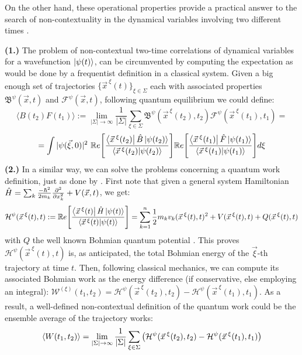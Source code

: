 \documentclass[11pt, a4paper]{article} %
\newcommand{\B}{\mathfrak{B}}
\begin{document}
On the other hand, these operational properties provide a practical answer to the search of non-contextuality in the dynamical variables involving two different times \cite{DevInPosition1}. 

{\bf (1.)} The problem of non-contextual two-time correlations of dynamical variables for a wavefunction $\ket{\psi(t)}$, can be circumvented by computing the expectation as would be done by a frequentist definition in a classical system. Given a big enough set of trajectories $\{\vec{x}^{\:\xi}(t)\}_{\xi\in \Sigma}$ each with associated properties $\B^\psi(\vec{x},t)$ and $\mathcal{F}^\psi(\vec{x},t)$, following quantum equilibrium \cite{Absolute} we could define:\vspace{-0.2cm}
\begin{equation}
\langle B(t_2)F(t_1)\rangle := \lim_{|\Sigma|\rightarrow \infty}\frac{1}{|\Sigma|} \sum_{\xi\in\Sigma} \B^\psi(\vec{x}^{\:\xi}(t_2),t_2)\mathcal{F}^\psi(\vec{x}^{\:\xi}(t_1),t_1) =
\end{equation}
$$
=  \int |\psi(\vec{\xi},0)|^2\ \mathbb{R}e\qty[ \frac{\bra{\vec{x}^{\:\xi}(t_2)}\hat{B}\ket{\psi(t_2)}}{\bra{\vec{x}^{\:\xi}(t_2)}\ket{\psi(t_2)}} ] \mathbb{R}e\qty[ \frac{\bra{\vec{x}^{\:\xi}(t_1)}\hat{F}\ket{\psi(t_1)}}{\bra{\vec{x}^{\:\xi}(t_1)}\ket{\psi(t_1)}} ]d\xi
$$
{\bf (2.) } In a similar way, we can solve the problems concerning a quantum work definition, just as done by \cite{work1, work2}. First note that given a general system Hamiltonian $\hat{H}=\sum_k \frac{-\hbar^2}{2m_k}\pdv[2]{}{x_k}+V(\vec{x},t)$, we get:
\begin{equation}
\mathcal{H}^\psi(\vec{x}^{\:\xi}(t),t) := \mathbb{R}e\qty[ \frac{\bra{\vec{x}^{\:\xi}(t)}\hat{H}\ket{\psi(t)}}{\bra{\vec{x}^{\:\xi}(t)}\ket{\psi(t)}} ] = \sum_{k=1}^n\frac{1}{2}m_kv_k(\vec{x}^{\:\xi}(t),t)^2+V(\vec{x}^{\:\xi}(t),t)+Q(\vec{x}^{\:\xi}(t),t)
\end{equation}
with $Q$ the well known Bohmian quantum potential \cite{Holland, Durr, JordiXavier}. This proves $\mathcal{H}^\psi(\vec{x}^{\:\xi}(t),t)$ is, as anticipated, the total Bohmian energy of the $\vec{\xi}$-th trajectory at time $t$. Then, following classical mechanics, we can compute its associated Bohmian work as the energy difference (if conservative, else employing an integral): $\mathcal{W}^{(\xi)}(t_1,t_2)= \mathcal{H}^\psi(\vec{x}^{\:\xi}(t_2),t_2)-\mathcal{H}^\psi(\vec{x}^{\:\xi}(t_1),t_1)$. As a result, a well-defined non-contextual definition of the quantum work could be the ensemble average of the trajectory works:
\begin{equation}
\langle W(t_1,t_2)\rangle = \lim_{|\Sigma|\rightarrow \infty}\frac{1}{|\Sigma|} \sum_{\xi\in\Sigma} \qty(\mathcal{H}^\psi(\vec{x}^{\:\xi}(t_2),t_2)-\mathcal{H}^\psi(\vec{x}^{\:\xi}(t_1),t_1))
\end{equation}
\end{document}
